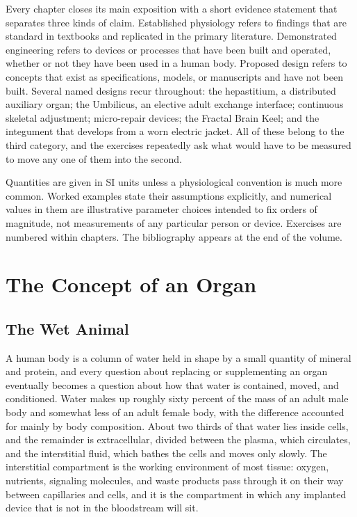 \documentclass[11pt,openany]{book}
\theoremstyle{definition}
\theoremstyle{remark}
\begin{document}
Every chapter closes its main exposition with a short evidence statement that separates three kinds of claim. Established physiology refers to findings that are standard in textbooks and replicated in the primary literature. Demonstrated engineering refers to devices or processes that have been built and operated, whether or not they have been used in a human body. Proposed design refers to concepts that exist as specifications, models, or manuscripts and have not been built. Several named designs recur throughout: the hepastitium, a distributed auxiliary organ; the Umbilicus, an elective adult exchange interface; continuous skeletal adjustment; micro-repair devices; the Fractal Brain Keel; and the integument that develops from a worn electric jacket. All of these belong to the third category, and the exercises repeatedly ask what would have to be measured to move any one of them into the second.

Quantities are given in SI units unless a physiological convention is much more common. Worked examples state their assumptions explicitly, and numerical values in them are illustrative parameter choices intended to fix orders of magnitude, not measurements of any particular person or device. Exercises are numbered within chapters. The bibliography appears at the end of the volume.

\tableofcontents

\mainmatter

\part{The Concept of an Organ}

\chapter{The Wet Animal}
\label{ch:wet}

A human body is a column of water held in shape by a small quantity of mineral and protein, and every question about replacing or supplementing an organ eventually becomes a question about how that water is contained, moved, and conditioned. Water makes up roughly sixty percent of the mass of an adult male body and somewhat less of an adult female body, with the difference accounted for mainly by body composition. About two thirds of that water lies inside cells, and the remainder is extracellular, divided between the plasma, which circulates, and the interstitial fluid, which bathes the cells and moves only slowly. The interstitial compartment is the working environment of most tissue: oxygen, nutrients, signaling molecules, and waste products pass through it on their way between capillaries and cells, and it is the compartment in which any implanted device that is not in the bloodstream will sit.
\end{document}
